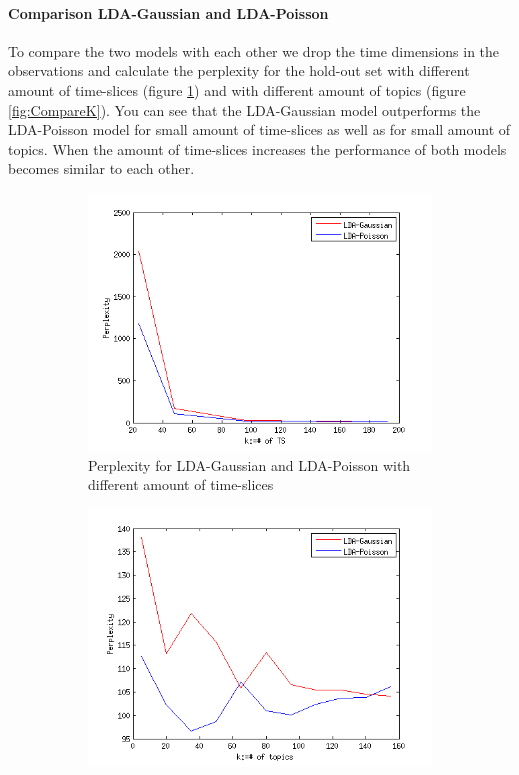 \documentclass[a4paper,fleqn]{article}
\begin{document}
\paragraph{Comparison LDA-Gaussian and LDA-Poisson}

To compare the two models with each other we drop the time dimensions in the observations and calculate the perplexity for the hold-out set with different amount of time-slices (figure \ref{fig:CompareTS}) and with different amount of topics (figure \ref{fig:CompareK}).
You can see that the LDA-Gaussian model outperforms the LDA-Poisson model for small amount of time-slices as well as for small amount of topics. When the amount of time-slices increases the performance of both models becomes similar to each other. 

\begin{figure}[h!]
 \centering
 \begin{subfigure}[b]{0.45\linewidth}
  \centering
  \includegraphics[width=\textwidth]{Pictures/CompareTSgausPois.png}
  \caption{Perplexity for LDA-Gaussian and LDA-Poisson with different amount of time-slices}
  \label{fig:CompareTS}
 \end{subfigure}
 \begin{subfigure}[b]{0.45\linewidth}
  \centering
  \includegraphics[width=\textwidth]{Pictures/CompareKgausPois.png}

\end{subfigure}
\end{figure}
\end{document}
